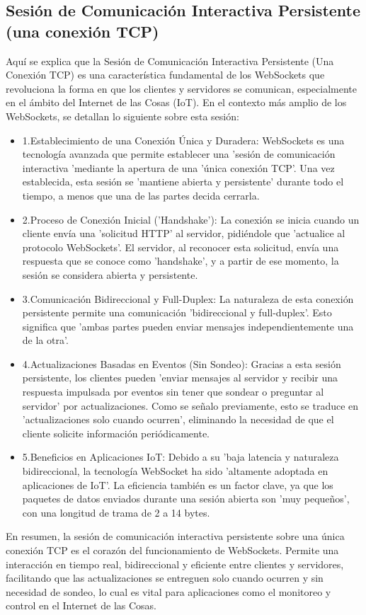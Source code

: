 \documentclass{report}
\begin{document}
\subsection{Sesión de Comunicación Interactiva Persistente (una conexión TCP)}
Aquí se explica que la  Sesión de Comunicación Interactiva Persistente (Una Conexión TCP) es una característica fundamental 
de los  WebSockets que revoluciona la forma en que los clientes y servidores se comunican, especialmente en el ámbito del 
Internet de las Cosas (IoT).
En el contexto más amplio de los WebSockets, se detallan lo siguiente sobre esta sesión:
\begin{itemize}
    \item 1.Establecimiento de una Conexión Única y Duradera: WebSockets es una tecnología avanzada que permite establecer 
    una 'sesión de comunicación interactiva 'mediante la apertura de una 'única conexión TCP'. Una vez establecida, esta sesión 
    se 'mantiene abierta y persistente' durante todo el tiempo, a menos que una de las partes decida cerrarla.
    \item 2.Proceso de Conexión Inicial ('Handshake'): La conexión se inicia cuando un cliente envía una 'solicitud HTTP'  
    al servidor, pidiéndole que 'actualice al protocolo WebSockets'. El servidor, al reconocer esta solicitud, envía una 
    respuesta que se conoce como 'handshake', y a partir de ese momento, la sesión se considera abierta y persistente.
    \item 3.Comunicación Bidireccional y Full-Duplex: La naturaleza de esta conexión persistente permite una comunicación 
    'bidireccional y full-duplex'. Esto significa que 'ambas partes pueden enviar mensajes independientemente una de la otra'.
    \item 4.Actualizaciones Basadas en Eventos (Sin Sondeo): Gracias a esta sesión persistente, los clientes pueden 'enviar mensajes 
    al servidor y recibir una respuesta impulsada por eventos sin tener que sondear o preguntar al servidor' por actualizaciones. 
    Como se señalo previamente, esto se traduce en 'actualizaciones solo cuando ocurren', eliminando la necesidad de que el 
    cliente solicite información periódicamente.
    \item 5.Beneficios en Aplicaciones IoT: Debido a su 'baja latencia y naturaleza bidireccional, la tecnología WebSocket 
    ha sido 'altamente adoptada en aplicaciones de IoT'. La eficiencia también es un factor clave, ya que los paquetes de datos 
    enviados durante una sesión abierta son 'muy pequeños', con una longitud de trama de 2 a 14 bytes.
\end{itemize}
En resumen, la  sesión de comunicación interactiva persistente sobre una única conexión TCP  es el corazón del funcionamiento 
de WebSockets. Permite una interacción en tiempo real, bidireccional y eficiente entre clientes y servidores, facilitando que las 
actualizaciones se entreguen solo cuando ocurren y sin necesidad de sondeo, lo cual es vital para aplicaciones como el monitoreo 
y control en el Internet de las Cosas.
\end{document}
